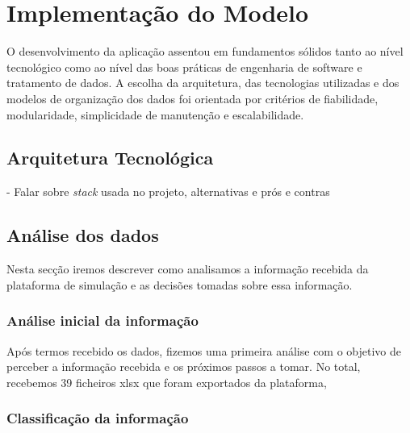 



\chapter{Implementação do Modelo}
\label{ch:implementacaoDoModelo}

O desenvolvimento da aplicação assentou em fundamentos sólidos tanto ao nível tecnológico como ao nível das boas práticas de engenharia de software e tratamento de dados. A escolha da arquitetura, das tecnologias utilizadas e dos modelos de organização dos dados foi orientada por critérios de fiabilidade, modularidade, simplicidade de manutenção e escalabilidade.

\section{Arquitetura Tecnológica}
- Falar sobre \textit{stack} usada no projeto, alternativas e prós e contras

\section{Análise dos dados}
Nesta secção iremos descrever como analisamos a informação recebida da plataforma de simulação e as decisões tomadas sobre essa informação.

\subsection{Análise inicial da informação}
Após termos recebido os dados, fizemos uma primeira análise com o objetivo de perceber a informação recebida e os próximos passos a tomar. No total, recebemos 39 ficheiros \gls{xlsx} que foram exportados da plataforma, 

\subsection{Classificação da informação}

